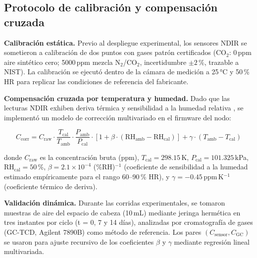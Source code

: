 \subsection{Protocolo de calibración y compensación cruzada}
\label{subsec:cap2_calibracion}

\textbf{Calibración estática.} Previo al despliegue experimental, los
sensores NDIR se sometieron a calibración de dos puntos con gases
patrón certificados (CO$_2$: 0\,ppm aire sintético cero; 5000\,ppm
mezcla N$_2$/CO$_2$, incertidumbre $\pm2$\,\%, trazable a NIST).
La calibración se ejecutó dentro de la cámara de medición a
25\,°C y 50\,\% HR para replicar las condiciones de referencia del
fabricante.

\textbf{Compensación cruzada por temperatura y humedad.} Dado que
las lecturas NDIR exhiben deriva térmica y sensibilidad a la
humedad relativa \autocite{biagiDevelopmentMachineLearningbased2024a},
se implementó un modelo de corrección multivariado en el firmware
del nodo:

\begin{equation}
    C_{\text{corr}} = C_{\text{raw}} \cdot \frac{T_{\text{cal}}}{T_{\text{amb}}} \cdot \frac{P_{\text{amb}}}{P_{\text{cal}}} \cdot \left[ 1 + \beta \cdot (\text{RH}_{\text{amb}} - \text{RH}_{\text{cal}}) \right] + \gamma \cdot (T_{\text{amb}} - T_{\text{cal}})
    \label{eq:compensacion_ndir}
\end{equation}

donde $C_{\text{raw}}$ es la concentración bruta (ppm),
$T_{\text{cal}} = 298.15$\,K, $P_{\text{cal}} = 101.325$\,kPa,
$\text{RH}_{\text{cal}} = 50$\,\%, $\beta = 2.1 \times 10^{-4}$
(\%RH)$^{-1}$ (coeficiente de sensibilidad a la humedad estimado
empíricamente para el rango 60--90\,\% HR), y $\gamma = -0.45$\,ppm\,K$^{-1}$
(coeficiente térmico de deriva).

\textbf{Validación dinámica.} Durante las corridas experimentales,
se tomaron muestras de aire del espacio de cabeza (10\,mL) mediante
jeringa hermética en tres instantes por ciclo (t = 0, 7 y 14 días),
analizadas por cromatografía de gases (GC-TCD, Agilent 7890B)
como método de referencia. Los pares $(C_{\text{sensor}},
C_{\text{GC}})$ se usaron para ajuste recursivo de los coeficientes
$\beta$ y $\gamma$ mediante regresión lineal multivariada.

